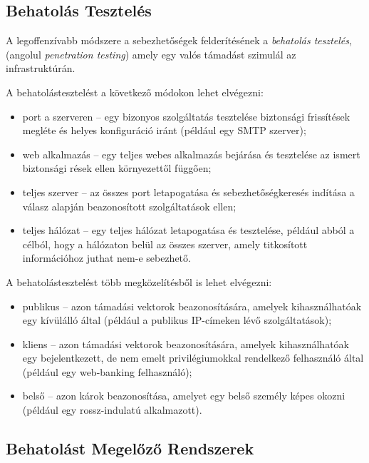 \documentclass[a4paper,12pt]{article}
\begin{document}
\subsection{Behatolás Tesztelés}
	
	A legoffenzívabb módszere a sebezhetőségek felderítésének a \textit{behatolás tesztelés}, (angolul \textit{penetration testing}) amely egy valós támadást szimulál az infrastruktúrán.
	
	\noindent A behatolástesztelést a következő módokon lehet elvégezni:
	
	\begin{itemize}
		\item port a szerveren -- egy bizonyos szolgáltatás tesztelése biztonsági frissítések megléte és helyes konfiguráció iránt (például egy SMTP szerver);
		\item web alkalmazás -- egy teljes webes alkalmazás bejárása és tesztelése az ismert biztonsági rések ellen környezettől függően;
		\item teljes szerver -- az összes port letapogatása és sebezhetőségkeresés indítása a válasz alapján beazonosított szolgáltatások ellen;
		\item teljes hálózat -- egy teljes hálózat letapogatása és tesztelése, például abból a célból, hogy a hálózaton belül az összes szerver, amely titkosított információhoz juthat nem-e sebezhető.
	\end{itemize}
	
	\noindent A behatolástesztelést több megközelítésből is lehet elvégezni:
	
	\begin{itemize}
		\item publikus -- azon támadási vektorok beazonosítására, amelyek kihasználhatóak egy kívülálló által (például a publikus IP-címeken lévő szolgáltatások);
		\item kliens -- azon támadási vektorok beazonosítására, amelyek kihasználhatóak egy bejelentkezett, de nem emelt privilégiumokkal rendelkező felhasználó által (például egy web-banking felhasználó);
		\item belső -- azon károk beazonosítása, amelyet egy belső személy képes okozni (például egy rossz-indulatú alkalmazott).
	\end{itemize}

\subsection{Behatolást Megelőző Rendszerek}
	
\end{document}
